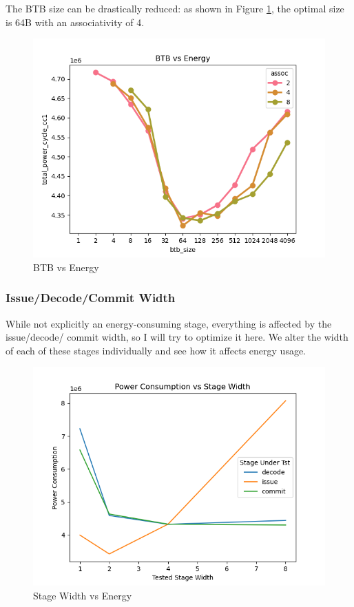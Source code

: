\documentclass{article}
\newcommand{\optimisation}[1]{
  
}
\begin{document}
\begin{multicols}{2}
  \optimisation{bpred}

  The BTB size can be drastically reduced: as shown in Figure \ref{fig:btb_vs_energy}, the optimal size is 64B with an associativity of 4.

  \begin{figure}[H]
    \centering
    \includegraphics[width=\linewidth]{./assets/btb_vs_energy.png}
    \caption{BTB vs Energy}
    \label{fig:btb_vs_energy}
  \end{figure}

  \optimisation{btb}

  \subsubsection{Issue/Decode/Commit Width}
  While not explicitly an energy-consuming stage, everything is affected by the issue/decode/
  commit width, so I will try to optimize it here. We alter the width of each of these stages individually and see how it affects energy usage.

  \begin{figure}[H]
    \centering
    \includegraphics[width=\linewidth]{./assets/width_vs_energy.png}
    \caption{Stage Width vs Energy}
    \label{fig:width_vs_energy}
  \end{figure}


\end{multicols}
\end{document}
